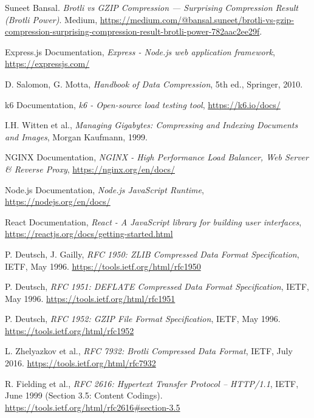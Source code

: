 \documentclass[12pt]{article}
\begin{document}
\begin{thebibliography}{9}
    Suneet Bansal.
    \textit{Brotli vs GZIP Compression — Surprising Compression Result (Brotli Power)}.
    Medium, \url{https://medium.com/@bansal.suneet/brotli-vs-gzip-compression-surprising-compression-result-brotli-power-782aac2ee29f}.

    Express.js Documentation,
    \textit{Express - Node.js web application framework},
    \url{https://expressjs.com/}

    D. Salomon, G. Motta,
    \textit{Handbook of Data Compression},
    5th ed., Springer, 2010.


    k6 Documentation,
    \textit{k6 - Open-source load testing tool},
    \url{https://k6.io/docs/}

    I.H. Witten et al.,
    \textit{Managing Gigabytes: Compressing and Indexing Documents and Images},
    Morgan Kaufmann, 1999.

    NGINX Documentation,
    \textit{NGINX - High Performance Load Balancer, Web Server \& Reverse Proxy},
    \url{https://nginx.org/en/docs/}

    Node.js Documentation,
    \textit{Node.js JavaScript Runtime},
    \url{https://nodejs.org/en/docs/}
	
    React Documentation,
    \textit{React - A JavaScript library for building user interfaces},
    \url{https://reactjs.org/docs/getting-started.html}

    P. Deutsch, J. Gailly,
    \textit{RFC 1950: ZLIB Compressed Data Format Specification},
    IETF, May 1996.
    \url{https://tools.ietf.org/html/rfc1950}

    P. Deutsch,
    \textit{RFC 1951: DEFLATE Compressed Data Format Specification},
    IETF, May 1996.
    \url{https://tools.ietf.org/html/rfc1951}

    P. Deutsch,
    \textit{RFC 1952: GZIP File Format Specification},
    IETF, May 1996.
    \url{https://tools.ietf.org/html/rfc1952}

    L. Zhelyazkov et al.,
    \textit{RFC 7932: Brotli Compressed Data Format},
    IETF, July 2016.
    \url{https://tools.ietf.org/html/rfc7932}

    R. Fielding et al.,
    \textit{RFC 2616: Hypertext Transfer Protocol -- HTTP/1.1},
    IETF, June 1999 (Section 3.5: Content Codings).
    \url{https://tools.ietf.org/html/rfc2616#section-3.5}



\end{thebibliography}
\end{document}
